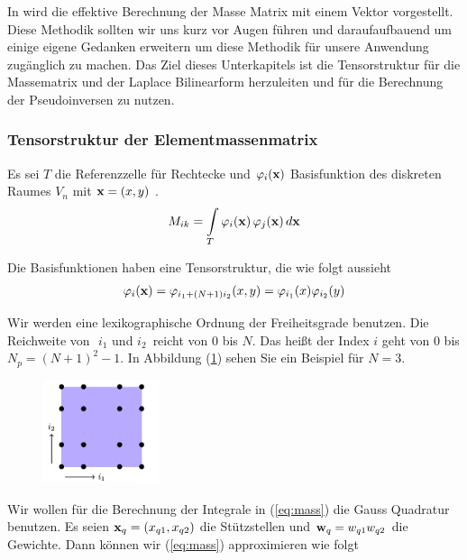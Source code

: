 In \cite{Teachlet} wird die effektive Berechnung der Masse Matrix mit einem Vektor vorgestellt. Diese Methodik sollten wir uns kurz vor Augen führen und daraufaufbauend um einige eigene Gedanken erweitern um diese Methodik für unsere Anwendung zugänglich zu machen.
Das Ziel dieses Unterkapitels ist die Tensorstruktur für die Massematrix und der Laplace Bilinearform herzuleiten und für die Berechnung der Pseudoinversen zu nutzen. 

\subsubsection{Tensorstruktur der Elementmassenmatrix}
Es sei $T$ die Referenzzelle für Rechtecke und $\varphi_i(\bold{x})$ Basisfunktion des diskreten Raumes $V_n$ mit $\bold{x}=(x,y)$ .
\begin{equation} \label{eq:mass}
M_{ik} = \int\limits_{T} \varphi_i (\bold{x}) \, \varphi_j (\bold{x}) \, d\bold{x}
\end{equation}

Die Basisfunktionen haben eine Tensorstruktur, die wie folgt aussieht
\begin{equation} \label{eq:tensor}
\varphi_i(\bold{x})=\varphi_{i_1+(N+1)i_2}(x,y)=\varphi_{i_1}(x)\varphi_{i_2}(y)
\end{equation}

Wir werden eine lexikographische Ordnung der Freiheitsgrade benutzen. Die Reichweite von $\, \, i_1 $ und $ i_2 \, $ reicht von $0$ bis $N$. Das heißt der Index $i$ geht von $0$ bis $N_p=(N+1)^2-1$. In Abbildung (\ref{fig:lexi}) sehen Sie ein Beispiel für $N=3$.

\begin{figure}[ht] 
	\centering
  \includegraphics[width=0.3\textwidth]{lexi.png}
	\caption{ \cite[3]{Teachlet}}
	\label{fig:lexi}
\end{figure}

Wir wollen für die Berechnung der Integrale in (\ref{eq:mass}) die Gauss Quadratur benutzen.
Es seien $\bold{x}_q=(x_{q1},x_{q2})$ die Stützstellen und $\bold{w}_q=w_{q1}w_{q2}$ die Gewichte. Dann können wir (\ref{eq:mass}) approximieren wie folgt


